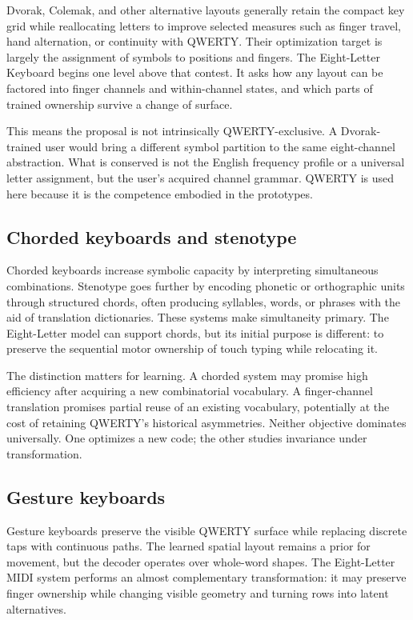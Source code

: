 \documentclass[11pt]{article}
\begin{document}
Dvorak, Colemak, and other alternative layouts generally retain the compact key grid while reallocating letters to improve selected measures such as finger travel, hand alternation, or continuity with QWERTY. Their optimization target is largely the assignment of symbols to positions and fingers. The Eight-Letter Keyboard begins one level above that contest. It asks how any layout can be factored into finger channels and within-channel states, and which parts of trained ownership survive a change of surface.

This means the proposal is not intrinsically QWERTY-exclusive. A Dvorak-trained user would bring a different symbol partition to the same eight-channel abstraction. What is conserved is not the English frequency profile or a universal letter assignment, but the user's acquired channel grammar. QWERTY is used here because it is the competence embodied in the prototypes.

\subsection{Chorded keyboards and stenotype}

Chorded keyboards increase symbolic capacity by interpreting simultaneous combinations. Stenotype goes further by encoding phonetic or orthographic units through structured chords, often producing syllables, words, or phrases with the aid of translation dictionaries. These systems make simultaneity primary. The Eight-Letter model can support chords, but its initial purpose is different: to preserve the sequential motor ownership of touch typing while relocating it.

The distinction matters for learning. A chorded system may promise high efficiency after acquiring a new combinatorial vocabulary. A finger-channel translation promises partial reuse of an existing vocabulary, potentially at the cost of retaining QWERTY's historical asymmetries. Neither objective dominates universally. One optimizes a new code; the other studies invariance under transformation.

\subsection{Gesture keyboards}

Gesture keyboards preserve the visible QWERTY surface while replacing discrete taps with continuous paths. The learned spatial layout remains a prior for movement, but the decoder operates over whole-word shapes. The Eight-Letter MIDI system performs an almost complementary transformation: it may preserve finger ownership while changing visible geometry and turning rows into latent alternatives.
\end{document}
